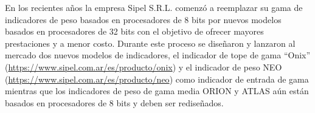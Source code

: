 \documentclass[11pt]{charter}
\begin{document}
%
%
%
%
%
%
%

En los recientes años la empresa Sipel S.R.L. comenzó a reemplazar su gama de indicadores de peso basados en procesadores de 8 bits por nuevos modelos basados en procesadores de 32 bits con el objetivo de ofrecer mayores prestaciones y a menor costo. Durante este proceso se diseñaron y lanzaron al mercado dos nuevos modelos de indicadores, el indicador de tope de gama “Onix” (\url{https://www.sipel.com.ar/es/producto/onix}) y el indicador de peso NEO (\url{https://www.sipel.com.ar/es/producto/neo}) como indicador de entrada de gama mientras que los indicadores de peso de gama media ORION y ATLAS  aún están basados en procesadores de 8 bits y deben ser rediseñados.\\
\end{document}
